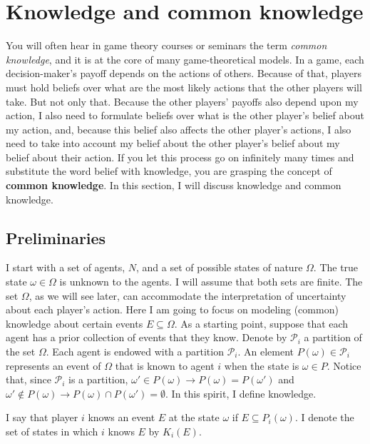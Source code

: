 \documentclass[../main.tex]{subfiles}
\begin{document}
\section{Knowledge and common knowledge}
You will often hear in game theory courses or seminars the term \textit{common knowledge}, and it is at the core of many game-theoretical models. In a game, each decision-maker's payoff depends on the actions of others. Because of that, players must hold beliefs over what are the most likely actions that the other players will take. But not only that. Because the other players' payoffs also depend upon my action, I also need to formulate beliefs over what is the other player's belief about my action, and, because this belief also affects the other player's actions, I also need to take into account my belief about the other player's belief about my belief about their action. If you let this process go on infinitely many times and substitute the word belief with knowledge, you are grasping the concept of \textbf{common knowledge}. In this section, I will discuss knowledge and common knowledge.

\subsection{Preliminaries}
I start with a set of agents, $N$, and a set of possible states of nature $\Omega$. The true state $\omega\in\Omega$ is unknown to the agents. I will assume that both sets are finite. The set $\Omega$, as we will see later, can accommodate the interpretation of uncertainty about each player's action. Here I am going to focus on modeling (common) knowledge about certain events $E\subseteq\Omega$. As a starting point, suppose that each agent has a prior collection of events that they know. Denote by $\mathcal{P}_i$ a partition of the set $\Omega$. Each agent is endowed with a partition $\mathcal{P}_i$. An element $P(\omega)\in\mathcal{P}_i$ represents an event of $\Omega$ that is known to agent $i$ when the state is $\omega\in P$. Notice that, since $\mathcal{P}_i$ is a partition, $\omega'\in P(\omega)\rightarrow P(\omega) = P(\omega')$ and $\omega'\notin P(\omega)\rightarrow P(\omega)\cap P(\omega')=\emptyset$. In this spirit, I define knowledge.

\begin{mydef}
    I say that player $i$ knows an event $E$ at the state $\omega$ if $E\subseteq P_i(\omega)$. I denote the set of states in which $i$ knows $E$ by $K_i(E)$.
\end{mydef}
\end{document}
